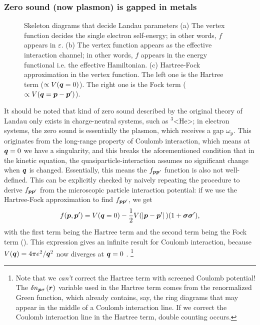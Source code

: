 \documentclass[hyperref, a4paper]{article}
\def\ce#1{<#1>}%
\begin{document}
\subsubsection{Zero sound (now plasmon) is gapped in metals}

\begin{figure}
    \centering
    
    \caption{Skeleton diagrams that decide Landau parameters 
    (a) The vertex function decides the single electron self-energy; 
    in other words, $f$ appears in $\varepsilon$.
    (b) The vertex function appears as the effective interaction channel; 
    in other words, $f$ appears in the energy functional i.e. the effective Hamiltonian.
    (c) Hartree-Fock approximation in the vertex function.
    The left one is the Hartree term ($\propto V(\vb*{q} = 0)$).
    The right one is the Fock term ($\propto V(\vb*{q} = \vb*{p} - \vb*{p}')$).}
    \label{fig:hf-vertex}
\end{figure}

It should be noted that kind of zero sound described by the original theory of Landau 
only exists in charge-neutral systems, 
such as $^3$\ce{He};
in electron systems,
the zero sound is essentially the plasmon, 
which receives a gap $\omega_{\text{p}}$.
This originates from the long-range property of Coulomb interaction,
which means at $\vb*{q} = 0$ we have a singularity, 
and this breaks the aforementioned condition 
that in the kinetic equation, 
the quasiparticle-interaction assumes no significant change when $\vb*{q}$ is changed. 
Essentially, this means the $f_{\vb*{p} \vb*{p}'}$ function is also not well-defined.
This can be explicitly checked by naively repeating the procedure 
to derive $f_{\vb*{p} \vb*{p}'}$ from the microscopic particle interaction potential:
if we use the Hartree-Fock approximation to find $f_{\vb*{p} \vb*{p}'}$, 
we get 
\begin{equation}
    f(\vb*{p}, \vb*{p}') = 
    V(\vb*{q} = 0) - \frac{1}{2} V(\abs*{\vb*{p} - \vb*{p}'}) (1 + \vb*{\sigma} \vb*{\sigma}'),
\end{equation}
with the first term being the Hartree term 
and the second term being the Fock term
().
This expression gives an infinite result for Coulomb interaction, 
because $V(\vb*{q}) = 4 \pi e^2 / \vb*{q}^2$ now diverges at $\vb*{q} = 0$ \cite{silin1958theory}.%
\footnote{
    Note that we \emph{can't} correct the Hartree term with screened Coulomb potential!
    The $\var{n}_{\vb*{p} \sigma}(\vb*{r})$ variable used in the Hartree term 
    comes from the renormalized Green function, 
    which already contains, say, the ring diagrams that may appear 
    in the middle of a Coulomb interaction line.
    If we correct the Coulomb interaction line in the Hartree term, 
    double counting occurs. 
}
\end{document}
